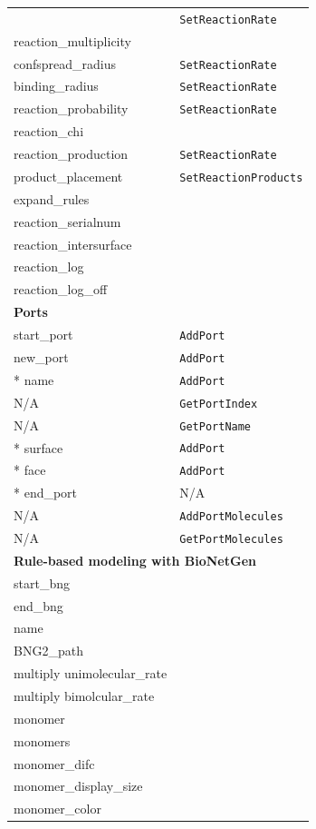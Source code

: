 \documentclass {book}
\newcommand {\ttt} {\texttt}
\begin{document}
\begin{longtable}[c]{ll}
& \ttt{SetReactionRate}\\
reaction\_multiplicity \\ %
confspread\_radius & \ttt{SetReactionRate}\\
binding\_radius & \ttt{SetReactionRate}\\
reaction\_probability & \ttt{SetReactionRate}\\
reaction\_chi \\ %
reaction\_production & \ttt{SetReactionRate}\\
product\_placement & \ttt{SetReactionProducts}\\
expand\_rules \\ %
reaction\_serialnum \\ %
reaction\_intersurface \\ %
reaction\_log \\ %
reaction\_log\_off \\ %
\hline
\multicolumn{2}{l}{\hspace{0.3in}\textbf{Ports}}\\
\hline
start\_port & \ttt{AddPort}\\
new\_port & \ttt{AddPort}\\
{*} name & \ttt{AddPort}\\
N/A & \ttt{GetPortIndex}\\
N/A & \ttt{GetPortName}\\
{*} surface & \ttt{AddPort}\\
{*} face & \ttt{AddPort}\\
{*} end\_port & N/A\\
N/A & \ttt{AddPortMolecules}\\
N/A & \ttt{GetPortMolecules}\\
\hline
\multicolumn{2}{l}{\hspace{0.3in}\textbf{Rule-based modeling with BioNetGen}}\\
\hline
start\_bng \\ %
end\_bng \\ %
name \\ %
BNG2\_path \\ %
multiply unimolecular\_rate \\ %
multiply bimolcular\_rate \\ %
monomer \\ %
monomers \\ %
monomer\_difc \\ %
monomer\_display\_size \\ %
monomer\_color \\ %

\end{longtable}
\end{document}
